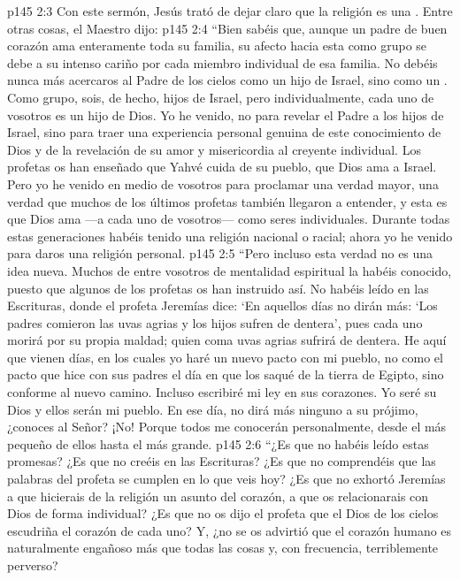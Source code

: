 \vs p145 2:3 Con este sermón, Jesús trató de dejar claro que la religión es una . Entre otras cosas, el Maestro dijo:
\vs p145 2:4 “Bien sabéis que, aunque un padre de buen corazón ama enteramente toda su familia, su afecto hacia esta como grupo se debe a su intenso cariño por cada miembro individual de esa familia. No debéis nunca más acercaros al Padre de los cielos como un hijo de Israel, sino como un . Como grupo, sois, de hecho, hijos de Israel, pero individualmente, cada uno de vosotros es un hijo de Dios. Yo he venido, no para revelar el Padre a los hijos de Israel, sino para traer una experiencia personal genuina de este conocimiento de Dios y de la revelación de su amor y misericordia al creyente individual. Los profetas os han enseñado que Yahvé cuida de su pueblo, que Dios ama a Israel. Pero yo he venido en medio de vosotros para proclamar una verdad mayor, una verdad que muchos de los últimos profetas también llegaron a entender, y esta es que Dios  ama ---a cada uno de vosotros--- como seres individuales. Durante todas estas generaciones habéis tenido una religión nacional o racial; ahora yo he venido para daros una religión personal.
\vs p145 2:5 “Pero incluso esta verdad no es una idea nueva. Muchos de entre vosotros de mentalidad espiritual la habéis conocido, puesto que algunos de los profetas os han instruido así. No habéis leído en las Escrituras, donde el profeta Jeremías dice: ‘En aquellos días no dirán más: ‘Los padres comieron las uvas agrias y los hijos sufren de dentera’, pues cada uno morirá por su propia maldad; quien coma uvas agrias sufrirá de dentera. He aquí que vienen días, en los cuales yo haré un nuevo pacto con mi pueblo, no como el pacto que hice con sus padres el día en que los saqué de la tierra de Egipto, sino conforme al nuevo camino. Incluso escribiré mi ley en sus corazones. Yo seré su Dios y ellos serán mi pueblo. En ese día, no dirá más ninguno a su prójimo, ¿conoces al Señor? ¡No! Porque todos me conocerán personalmente, desde el más pequeño de ellos hasta el más grande.
\vs p145 2:6 “¿Es que no habéis leído estas promesas? ¿Es que no creéis en las Escrituras? ¿Es que no comprendéis que las palabras del profeta se cumplen en lo que veis hoy? ¿Es que no exhortó Jeremías a que hicierais de la religión un asunto del corazón, a que os relacionarais con Dios de forma individual? ¿Es que no os dijo el profeta que el Dios de los cielos escudriña el corazón de cada uno? Y, ¿no se os advirtió que el corazón humano es naturalmente engañoso más que todas las cosas y, con frecuencia, terriblemente perverso?
